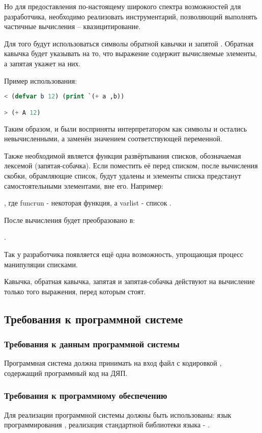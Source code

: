 Но для предоставления по-настоящему широкого спектра возможностей для разработчика, необходимо реализовать инструментарий, позволяющий выполнять частичные вычисления -- квазицитирование.

Для того будут использоваться символы обратной кавычки  и запятой \quotes{,}. Обратная кавычка будет указывать на то, что выражение содержит вычисляемые элементы, а запятая укажет на них.

Пример использования:
\begin{lstlisting}[language=Lisp, frame=none]
< (defvar b 12) (print `(+ a ,b))

> (+ A 12)
\end{lstlisting}

Таким образом, \quotes{+} и  были восприняты интерпретатором как символы и остались невычисленными, а  заменён значением соответствующей переменной.

Также необходимой является функция развёртывания списков, обозначаемая лексемой  (запятая-собачка). Если поместить её перед списком, после вычисления скобки, обрамляющие список, будут удалены и элементы списка предстанут самостоятельными элементами, вне его. Например:

, где funcrun - некоторая функция, а varlist - список .

После вычисления будет преобразовано в:

.

Так у разработчика появляется ещё одна возможность, упрощающая процесс манипуляции списками.

Кавычка, обратная кавычка, запятая и запятая-собачка действуют на вычисление только того выражения, перед которым стоят.


\subsection{Требования к программной системе}

\subsubsection{Требования к данным программной системы}
Программная система должна принимать на вход файл с кодировкой , содержащий программный код на ДЯП.

\subsubsection{Требования к программному обеспечению}
Для реализации программной системы должны быть использованы: язык программирования , реализация стандартной библиотеки языка - .

